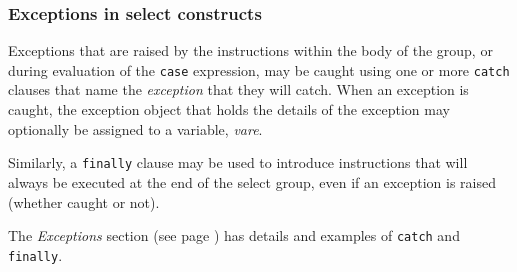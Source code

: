 \subsubsection{Exceptions in select constructs}
 
Exceptions that are raised by the instructions within the body of the
group, or during evaluation of the \texttt{case} expression, may be
caught using one or more \texttt{catch} clauses that name
the \emph{exception} that they will catch.
When an exception is caught, the exception object that holds the details
of the exception may optionally be assigned to a variable,
\emph{vare}.
 
Similarly, a \texttt{finally} clause may be used to introduce
instructions that will always be executed at the end of the select
group, even if an exception is raised (whether caught or not).
 
The  \emph{Exceptions} section (see page \pageref{refexcep})  has details and
examples of \texttt{catch} and \texttt{finally}.
\index{,}
